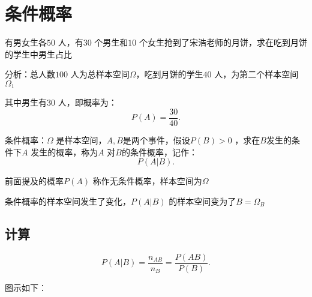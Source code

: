 \def\lecturer{SongHao}
\def\noter{THF}
\def\className{Probability Theory and Mathematical Statistics}
\def\term{III-A}



\maketitle
\tableofcontents
\section{条件概率}%
\label{sec:条件概率}
\begin{eg}
    有男女生各$50$ 人，有$30$ 个男生和$10$ 个女生抢到了宋浩老师的月饼，求在吃到月饼的学生中男生占比

    分析：总人数$100$ 人为总样本空间$\Omega$，吃到月饼的学生$40$ 人，为第二个样本空间$\Omega_1$

    其中男生有$30$ 人，即概率为：\[
        P\left( A \right) =\frac{30}{40}
    .\] 
\end{eg}
\begin{defi}
    条件概率：$\Omega$ 是样本空间，$A,B$是两个事件，假设$P\left( B \right) >0$ ，求在$B$发生的条件下$A$ 发生的概率，称为$A$ 对$B$的条件概率，记作：
    \[
        P\left( A|B \right) 
    .\] 
\end{defi}
前面提及的概率$P\left( A \right) $ 称作无条件概率，样本空间为$\Omega$ 

条件概率的样本空间发生了变化，$P\left( A|B \right) $ 的样本空间变为了$B=\Omega_B$ 

\subsection{计算}%
\label{sub:计算}
\[
    P\left( A|B \right) =\frac{n_{AB}}{n_B}=\frac{P\left( AB \right) }{P\left( B \right) }
.\] 

图示如下：
\begin{center}
\end{center}

